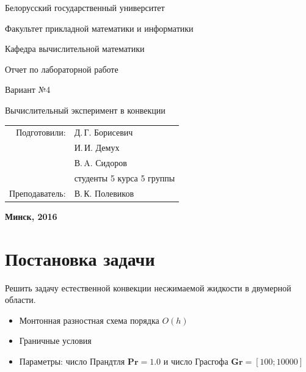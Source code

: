 \documentclass[a4paper, 12pt]{article}
\newcommand{\Pra}{\mathbf{Pr}}
\newcommand{\Gra}{\mathbf{Gr}}
\begin{document}
  \begin{titlepage}
    \begin{center} %
      \bfseries

      {\Large Белорусский государственный университет}

      \vspace{96pt}

      {\large Факультет прикладной математики и информатики}

      \vspace{72pt}

      {\large Кафедра вычислительной математики}

      \vspace{96pt}

      Отчет по лабораторной работе

      \vspace{24pt}

      Вариант №4

      \vspace{24pt}

      {\Large Вычислительный эксперимент в конвекции}

    \end{center}

    \vspace{120pt}

    \begin{flushright}
      \begin{tabular}{rl}
        Подготовили: & Д.\,Г. Борисевич \\
                     & И.\,И. Демух \\
                     & В.\,A. Сидоров \\
                     &студенты 5 курса 5 группы\\
        Преподаватель: & В.\,К. Полевиков \\
      \end{tabular}
    \end{flushright}

    \vfill

    \begin{center}
      \bfseries
      Минск, 2016
    \end{center}
  \end{titlepage}

  \section{Постановка задачи}
    Решить задачу естественной конвекции несжимаемой жидкости в двумерной
    области.
    \begin{itemize}
      \item Монтонная разностная схема порядка $O(h)$
      \item Граничные условия
      \item Параметры: число Прандтля $\Pra=1.0$ и число Грасгофа
        $\Gra=[100;10000]$
    \end{itemize}
  \pagebreak
\end{document}
